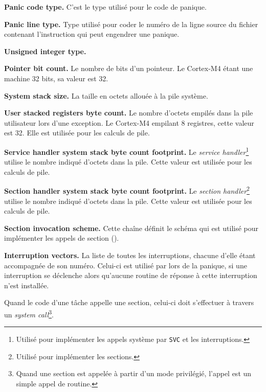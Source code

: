 {\bf Panic code type.} C'est le type utilisé pour le code de panique.

{\bf Panic line type.} Type utilisé pour coder le numéro de la ligne source du fichier contenant l'instruction qui peut engendrer une panique.

{\bf Unsigned integer type.}

{\bf Pointer bit count.} Le nombre de bits d'un pointeur. Le Cortex-M4 étant une machine 32 bits, sa valeur est 32.

{\bf System stack size.} La taille en octets allouée à la pile système.

{\bf User stacked registers byte count.} Le nombre d'octets empilés dans la pile utilisateur lors d'une exception. Le Cortex-M4 empilant 8 registres, cette valeur est 32. Elle est utilisée pour les calculs de pile.

{\bf Service handler system stack byte count footprint.} Le \emph{service handler}\footnote{Utilisé pour implémenter les appels système par \texttt{SVC} et les interruptions.} utilise le nombre indiqué d'octets dans la pile. Cette valeur est utilisée pour les calculs de pile.

{\bf Section handler system stack byte count footprint.} Le \emph{section handler}\footnote{Utilisé pour implémenter les sections.} utilise le nombre indiqué d'octets dans la pile. Cette valeur est utilisée pour les calculs de pile.

{\bf Section invocation scheme.} Cette chaîne définit le schéma qui est utilisé pour implémenter les appels de section ().

{\bf Interruption vectors.} La liste de toutes les interruptions, chacune d'elle étant accompagnée de son numéro. Celui-ci est utilisé par lors de la panique, si une interruption se déclenche alors qu'aucune routine de réponse à cette interruption n'est installée.







Quand le code d'une tâche appelle une section, celui-ci doit s'effectuer à travers un \emph{system call}\footnote{Quand une section est appelée à partir d'un mode privilégié, l'appel est un simple appel de routine.}.

